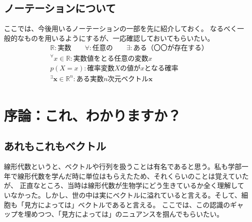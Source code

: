 \documentclass[10pt]{ujarticle}
\begin{document}
\subsection{ノーテーションについて}
ここでは、今後用いるノーテーションの一部を先に紹介しておく。
なるべく一般的なものを用いるようにするが、一応確認しておいてもらいたい。
$$
\begin{aligned}
  & \mathbb{R}:\text{実数}\qquad\forall:\text{任意の}\qquad\exists:\text{ある（〇〇が存在する）}\\
  & ^\forall x \in \mathbb{R}:\text{実数値をとる任意の変数} x \\
  & p(X=x):\text{確率変数} X \text{の値が} x \text{となる確率}\\
  & ^\exists\mathbf{x}\in\mathbb{R}^n:\text{ある実数} n \text{次元ベクトル}\mathbf{x}\\
\end{aligned}
$$

\section{序論：これ、わかりますか？}
\subsection{あれもこれもベクトル}
線形代数というと、ベクトルや行列を扱うことは有名であると思う。私も学部一年で線形代数を学んだ時に単位はもらえたため、それくらいのことは覚えていたが、
正直なところ、当時は線形代数が生物学にどう生きているか全く理解していなかった。しかし、世の中は実にベクトルに溢れていると言える。そして、細胞も「見方によっては」ベクトルであると言える。
ここでは、この認識のギャップを埋めつつ、「見方によっては」のニュアンスを掴んでもらいたい。
\end{document}
